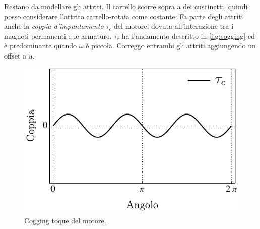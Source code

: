 Restano da modellare gli attriti.
Il carrello scorre sopra a dei cuscinetti,
quindi posso considerare l'attrito carrello-rotaia come costante.
Fa parte degli attriti anche la \emph{coppia d'impuntamento} $\tau_c$ del motore,
dovuta all'interazione tra i magneti permanenti e le armature. $\tau_c$ ha
l'andamento descritto in \autoref{fig:cogging} ed è predominante quando $\omega$ è
piccola.
Correggo entrambi gli attriti aggiungendo un offset a $u$.



\begin{figure}[H]
    \centering
    \includegraphics{assets/cogging-torque}
    \caption[Cogging torque]{Cogging toque del motore.}
    \label{fig:cogging}
\end{figure}

